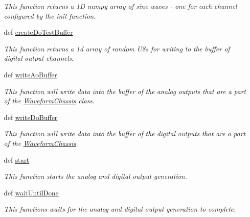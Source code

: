 \begin{DoxyCompactItemize}
\begin{DoxyCompactList}\small\item\em This function returns a 1\-D numpy array of sine waves -\/ one for each channel configured by the init function. \end{DoxyCompactList}\item 
def \hyperlink{class_chassis_8git_1_1_waveform_chassis_1_1_w_c_low_level_a65c28e1cc37d95535adf4ce05b0793e6}{create\-Do\-Test\-Buffer}
\begin{DoxyCompactList}\small\item\em This function returns a 1d array of random U8s for writing to the buffer of digital output channels. \end{DoxyCompactList}\item 
def \hyperlink{class_chassis_8git_1_1_waveform_chassis_1_1_w_c_low_level_a22ecf149d1c36906d461170b861f86a6}{write\-Ao\-Buffer}
\begin{DoxyCompactList}\small\item\em This function will write data into the buffer of the analog outputs that are a part of the \hyperlink{class_chassis_8git_1_1_waveform_chassis_1_1_waveform_chassis}{Waveform\-Chassis} class. \end{DoxyCompactList}\item 
def \hyperlink{class_chassis_8git_1_1_waveform_chassis_1_1_w_c_low_level_ae3f5f2856ecf80dc017d7e40e1694335}{write\-Do\-Buffer}
\begin{DoxyCompactList}\small\item\em This function will write data into the buffer of the digital outputs that are a part of the \hyperlink{class_chassis_8git_1_1_waveform_chassis_1_1_waveform_chassis}{Waveform\-Chassis}. \end{DoxyCompactList}\item 
def \hyperlink{class_chassis_8git_1_1_waveform_chassis_1_1_w_c_low_level_ab094a3cd2ac6272c8b839581e630a300}{start}
\begin{DoxyCompactList}\small\item\em This function starts the analog and digital output generation. \end{DoxyCompactList}\item 
def \hyperlink{class_chassis_8git_1_1_waveform_chassis_1_1_w_c_low_level_a460295e33b50119f12d21c0b4c7c425a}{wait\-Until\-Done}
\begin{DoxyCompactList}\small\item\em This functions waits for the analog and digital output generation to complete. \end{DoxyCompactList}\item 

\end{DoxyCompactItemize}
